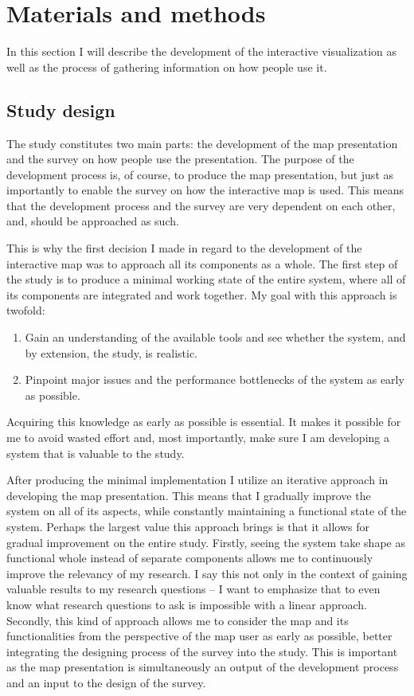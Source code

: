 \section{Materials and methods}
In this section I will describe the development of the interactive visualization
as well as the process of gathering information on how people use it.

\subsection{Study design}

The study constitutes two main parts:
the development of the map presentation and
the survey on how people use the presentation.
The purpose of the development process is, of course, to produce the map presentation,
but just as importantly to enable the survey on how the interactive map is used.
This means that the development process and the survey are very dependent on each other,
and, should be approached as such.

This is why the first decision I made in regard to
the development of the interactive map
was to approach all its components as a whole.  %
The first step of the study is
to produce a minimal working state of the entire system,
where all of its components are integrated and work together.
My goal with this approach is twofold:
\begin{enumerate}
	\item Gain an understanding of the available tools and see whether the system, and by extension, the study, is realistic.
	\item Pinpoint major issues and the performance bottlenecks of the system as early as possible.
\end{enumerate}

Acquiring this knowledge as early as possible is essential.
It makes it possible for me to avoid wasted effort and, most importantly,
make sure I am developing a system that is valuable to the study.

After producing the minimal implementation I utilize an iterative approach
in developing the map presentation.
This means that I gradually improve the system on all of its aspects,
while constantly maintaining a functional state of the system.
Perhaps the largest value this approach brings is that it allows for
gradual improvement on the entire study.
Firstly, seeing the system take shape as functional whole
instead of separate components allows me to
continuously improve the relevancy of my research.
I say this not only in the context of gaining valuable results to my research questions --
I want to emphasize that to even know what research questions to ask is impossible with a linear approach.
Secondly, this kind of approach allows me to consider
the map and its functionalities from the perspective of the map user as early as possible,
better integrating the designing process of the survey into the study.
This is important as the map presentation is simultaneously an output of the development process
and an input to the design of the survey.

